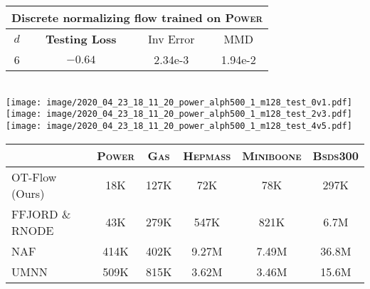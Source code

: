 \documentclass[letterpaper]{article}
\newcommand{\miniboone}{\textsc{Miniboone}}
\newcommand{\power}{\textsc{Power}}
\newcommand{\gas}{\textsc{Gas}}
\newcommand{\hepmass}{\textsc{Hepmass}}
\newcommand{\bsds}{\textsc{Bsds300}}
\newcommand{\model}{OT-Flow} %
\def\eu{\ensuremath{\mathrm{e}}}
\begin{document}
	\begin{figure*}
	    \centering
		\begin{minipage}{0.5\linewidth}
			\centering
			\begin{tabular}{cccc}
				\multicolumn{4}{c}{Discrete normalizing flow trained on \power{}} \\
				\midrule
				$d$ & \textbf{Testing Loss} & Inv Error & MMD \\
				\midrule
				6 & $\mathbf{-0.64}$ & 2.34\eu-3 & 1.94\eu-2 \\
			\end{tabular}
		\end{minipage}\\
		\texttt{[image: image/2020\_04\_23\_18\_11\_20\_power\_alph500\_1\_m128\_test\_0v1.pdf]}
		\texttt{[image: image/2020\_04\_23\_18\_11\_20\_power\_alph500\_1\_m128\_test\_2v3.pdf]}
		\texttt{[image: image/2020\_04\_23\_18\_11\_20\_power\_alph500\_1\_m128\_test\_4v5.pdf]}\\
	    \caption{\power{} density estimation for some discrete normalizing flow. By the testing loss metric, this model is considered very competitive. However, the model itself performs poorly, as clear in the visualization of the last two dimensions. The MMD shows that the generation is poor. The inverse error shows that the testing loss uses an integration scheme that is too coarse, as addressed in~\citet{wehenkel2019unconstrained} and ~\citet{onken2020do}.}
	    \label{fig:bad_power}
	\end{figure*} 








	\begin{table*}
		\centering
		 \begin{tabular}{lccccc}                                          
		 \toprule
		                             & \power{} & \gas{} & \hepmass{} & \miniboone{} & \bsds{} \\
		 \midrule
		 \model{} (Ours) 			& \hphantom{0}18K & 127K & \hphantom{.0}72K & \hphantom{.0}78K & \hphantom{.}297K \\
			FFJORD \& RNODE					& \hphantom{0}43K & 279K & \hphantom{.}547K & \hphantom{.}821K & \hphantom{0}6.7M \\
			\midrule
			NAF~\cite{huang2018neural}		     & 414K & 402K & 9.27M & 7.49M & 36.8M\\
			UMNN~\cite{wehenkel2019unconstrained}	 & 509K & 815K & 3.62M  & 3.46M  & 15.6M \\      
		 \bottomrule                               
		 \end{tabular}
		\caption{Number of parameters comparison with discrete normalizing flows.}
		\label{tab:params}
	\end{table*}
\end{document}
